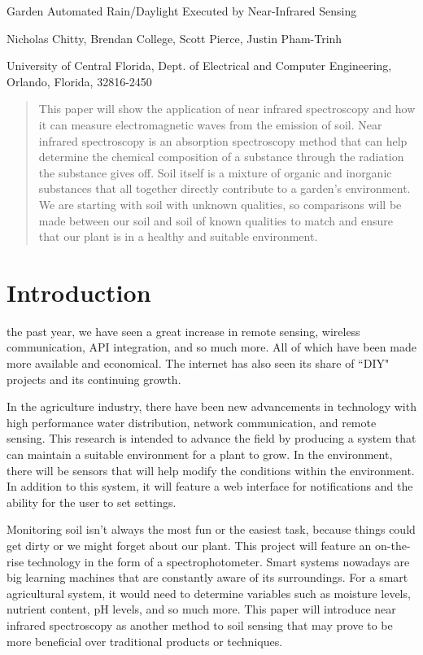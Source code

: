 \documentclass[journal]{IEEEtran}
\begin{document}
\begin{center}
   \Large Garden Automated Rain/Daylight Executed by Near-Infrared Sensing \break

   \large Nicholas Chitty, Brendan College, Scott Pierce, Justin Pham-Trinh \break

   \large University of Central Florida, Dept. of Electrical and Computer Engineering, Orlando,
   Florida, 32816-2450
\end{center}

\begin{abstract}
   This paper will show the application of near infrared spectroscopy 
and how it can measure electromagnetic waves from the emission of soil. Near infrared spectroscopy 
is an absorption spectroscopy method that can help determine the chemical composition of a 
substance through the radiation the substance gives off. Soil itself is a mixture of organic and 
inorganic substances that all together directly contribute to a garden’s environment. We are 
starting with soil with unknown qualities, so comparisons will be made between our soil and soil 
of known qualities to match and ensure that our plant is in a healthy and suitable environment. 
\end{abstract}

\section{Introduction}
 the past year, we have seen a great increase in remote sensing, wireless 
communication, API integration, and so much more. All of which have been made more available and 
economical. The internet has also seen its share of ``DIY" projects and its continuing growth.

In the agriculture industry, there have been new advancements in technology with high performance 
water distribution, network communication, and remote sensing. This research is intended to advance
the field by producing a system that can maintain a suitable environment for a plant to grow. In the 
environment, there will be sensors that will help modify the conditions within the environment. In 
addition to this system, it will feature a web interface for notifications and the ability for the 
user to set settings.

Monitoring soil isn't always the most fun or the easiest task, because things could get dirty or we 
might forget about our plant. This project will feature an on-the-rise technology in the form of a 
spectrophotometer. Smart systems nowadays are big learning machines that are constantly aware of its 
surroundings. For a smart agricultural system, it would need to determine variables such as moisture 
levels, nutrient content, pH levels, and so much more. This paper will introduce near infrared 
spectroscopy as another method to soil sensing that may prove to be more beneficial over traditional 
products or techniques.
\end{document}
